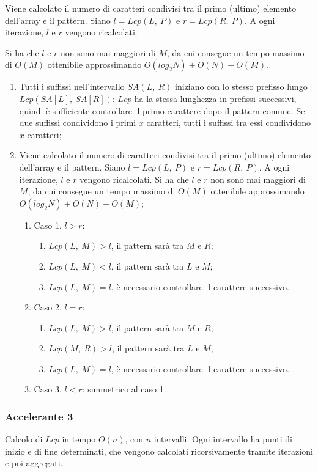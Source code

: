 Viene calcolato il numero di caratteri condivisi tra il primo (ultimo) elemento dell'array e il pattern. Siano $l = Lcp(L,\ P)$ e $r = Lcp(R,\ P)$. A ogni iterazione, $l$ e $r$ vengono ricalcolati. 

Si ha che $l$ e $r$ non sono mai maggiori di $M$, da cui consegue un tempo massimo di $O(M)$ ottenibile approssimando $O(log_2N) + O(N) + O(M)$.
\begin{enumerate}
	\item Tutti i suffissi nell'intervallo $SA(L,\ R)$ iniziano con lo stesso prefisso lungo $Lcp(SA[L],\ SA[R])$: $Lcp$ ha la stessa lunghezza in prefissi successivi, quindi è sufficiente controllare il primo carattere dopo il pattern comune. Se due suffissi condividono i primi $x$ caratteri, tutti i suffissi tra essi condividono $x$ caratteri;
	\item Viene calcolato il numero di caratteri condivisi tra il primo (ultimo) elemento dell'array e il pattern. Siano $l = Lcp(L,\ P)$ e $r = Lcp(R,\ P)$. A ogni iterazione, $l$ e $r$ vengono ricalcolati. Si ha che $l$ e $r$ non sono mai maggiori di $M$, da cui consegue un tempo massimo di $O(M)$ ottenibile approssimando $O(log_2N) + O(N) + O(M)$;
		\begin{enumerate}
		\item Caso 1, $l > r$: 
		\begin{enumerate}
			\item $Lcp(L,\ M) > l$, il pattern sarà tra $M$ e $R$;
			\item $Lcp(L,\ M) < l$, il pattern sarà tra $L$ e $M$;
			\item $Lcp(L,\ M) = l$, è necessario controllare il carattere successivo.
		\end{enumerate}
		\item Caso 2, $l = r$:
		\begin{enumerate}
			\item $Lcp(L,\ M) > l$, il pattern sarà tra $M$ e $R$;
			\item $Lcp(M,\ R) > l$, il pattern sarà tra $L$ e $M$;
			\item $Lcp(L,\ M) = l$, è necessario controllare il carattere successivo.
		\end{enumerate}
		\item Caso 3, $l < r$: simmetrico al caso 1.
		\end{enumerate}
\end{enumerate}

\subsubsection{Accelerante 3}
Calcolo di $Lcp$ in tempo $O(n)$, con $n$ intervalli. Ogni intervallo ha punti di inizio e di fine determinati, che vengono calcolati ricorsivamente tramite iterazioni e poi aggregati.
	
